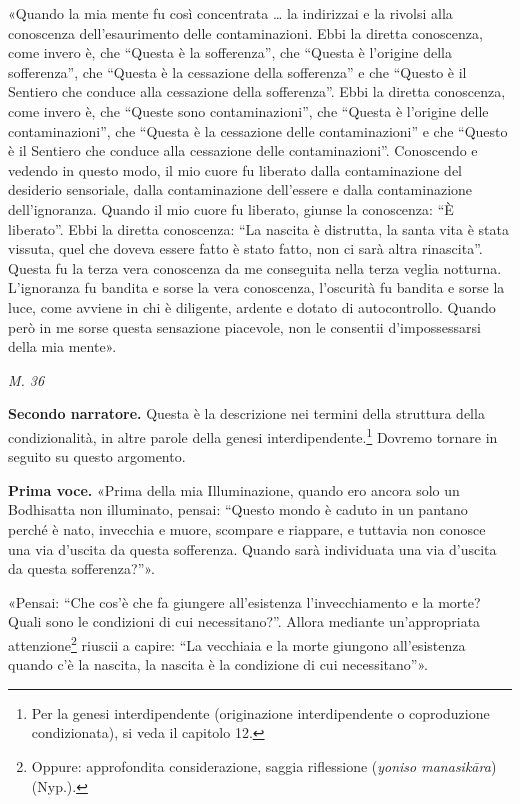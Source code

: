«Quando la mia mente fu così concentrata …​ la indirizzai e la rivolsi
alla conoscenza dell’esaurimento delle contaminazioni. Ebbi la diretta
conoscenza, come invero è, che “Questa è la sofferenza”, che “Questa è
l’origine della sofferenza”, che “Questa è la cessazione della
sofferenza” e che “Questo è il Sentiero che conduce alla cessazione
della sofferenza”. Ebbi la diretta conoscenza, come invero è, che
“Queste sono contaminazioni”, che “Questa è l’origine delle
contaminazioni”, che “Questa è la cessazione delle contaminazioni” e che
“Questo è il Sentiero che conduce alla cessazione delle contaminazioni”.
Conoscendo e vedendo in questo modo, il mio cuore fu liberato dalla
contaminazione del desiderio sensoriale, dalla contaminazione
dell’essere e dalla contaminazione dell’ignoranza. Quando il mio cuore
fu liberato, giunse la conoscenza: “È liberato”. Ebbi la diretta
conoscenza: “La nascita è distrutta, la santa vita è stata vissuta, quel
che doveva essere fatto è stato fatto, non ci sarà altra rinascita”.
Questa fu la terza vera conoscenza da me conseguita nella terza veglia
notturna. L’ignoranza fu bandita e sorse la vera conoscenza, l’oscurità
fu bandita e sorse la luce, come avviene in chi è diligente, ardente e
dotato di autocontrollo. Quando però in me sorse questa sensazione
piacevole, non le consentii d’impossessarsi della mia mente».


\emph{M. 36}


\textbf{Secondo narratore.} Questa è la descrizione nei termini della struttura
della condizionalità, in altre parole della genesi
interdipendente.\footnote{Per la genesi interdipendente (originazione interdipendente o coproduzione condizionata), si veda il capitolo 12.} Dovremo tornare in seguito su questo
argomento.


\textbf{Prima voce.} «Prima della mia Illuminazione, quando ero ancora solo un
Bodhisatta non illuminato, pensai: “Questo mondo è caduto in un pantano
perché è nato, invecchia e muore, scompare e riappare, e tuttavia non
conosce una via d’uscita da questa sofferenza. Quando sarà individuata
una via d’uscita da questa sofferenza?”».


«Pensai: “Che cos’è che fa giungere all’esistenza l’invecchiamento e la
morte? Quali sono le condizioni di cui necessitano?”. Allora mediante
un’appropriata attenzione\footnote{Oppure: approfondita considerazione, saggia riflessione (\emph{yoniso manasikāra}) (Nyp.).} riuscii a capire: “La
vecchiaia e la morte giungono all’esistenza quando c’è la nascita, la
nascita è la condizione di cui necessitano”».


